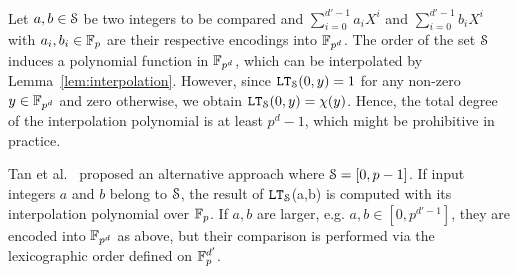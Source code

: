   Let $a,b \in \S$ be two integers to be compared and $\sum_{i=0}^{d'-1} a_i X^i$ and $\sum_{i=0}^{d'-1} b_i X^i$ with $a_i, b_i \in \F_p$ are their respective encodings into $\F_{p^d}$.
  The order of the set $\S$ induces a polynomial function in $\F_{p^d}$, which can be interpolated by Lemma~\ref{lem:interpolation}.
  However, since $\LT_\S(0,y) = 1$ for any non-zero $y \in \F_{p^d}$ and zero otherwise, we obtain $\LT_\S(0,y) = \chi(y)$.
  Hence, the total degree of the interpolation polynomial is at least $p^d-1$, 
  which might be prohibitive in practice.

  Tan et al.~\cite{TLWRK20} proposed an alternative approach where $\S = [0,p-1]$.
  If input integers $a$ and $b$ belong to $\S$, the result of $\LT_\S$(a,b) is computed with its interpolation polynomial over $\F_p$.  
  If $a,b$ are larger, e.g. $a,b \in [0,p^{d'-1}]$, they are encoded into $\F_{p^d}$ as above, but their comparison is performed via the lexicographic order defined on $\F_p^{d'}$.

